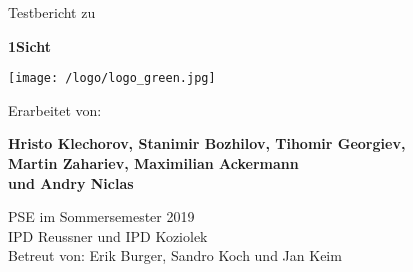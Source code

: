 \begin{titlepage}

    \begin{center}

        \vspace*{1cm}

            \LARGE
            Testbericht zu

            \Huge
            \textbf{1Sicht}

            \vspace{2cm}

            \texttt{[image: /logo/logo\_green.jpg]}

            \vspace{2cm}
            Erarbeitet von:

            \Large
            \textbf{Hristo Klechorov, Stanimir Bozhilov, Tihomir Georgiev,\\ Martin Zahariev, Maximilian Ackermann\\ und Andry Niclas}

            \vspace{0.3cm}
            \Large
            PSE im Sommersemester 2019\\
            \vspace{0.3cm}
            IPD Reussner und IPD Koziolek\\
            Betreut von: Erik Burger, Sandro Koch und Jan Keim


    \end{center}

\end{titlepage}
